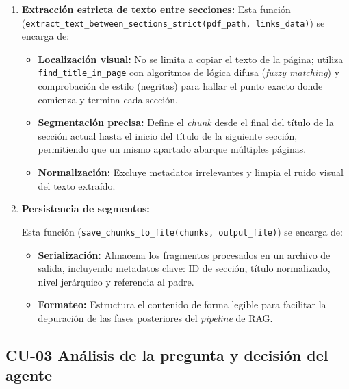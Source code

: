 \begin{enumerate}
    \item \textbf{Extracción estricta de texto entre secciones:}
    Esta función (\texttt{extract\_text\_be\-tween\_sec\-tions\_strict(pdf\_path, links\_data)}) se encarga de:
    \begin{itemize}
        \item \textbf{Localización visual:} No se limita a copiar el texto de la página; utiliza \texttt{find\_title\_\allowbreak in\_page} con algoritmos de lógica difusa (\textit{fuzzy matching}) y comprobación de estilo (negritas) para hallar el punto exacto donde comienza y termina cada sección.
        \item \textbf{Segmentación precisa:} Define el \textit{chunk} desde el final del título de la sección actual hasta el inicio del título de la siguiente sección, permitiendo que un mismo apartado abarque múltiples páginas.
        \item \textbf{Normalización:} Excluye metadatos irrelevantes y limpia el ruido visual del texto extraído.
    \end{itemize}

    \item \textbf{Persistencia de segmentos:}

    Esta función (\texttt{save\_chunks\_to\_file(chunks, output\_file)}) se encarga de:
    \begin{itemize}
        \item \textbf{Serialización:} Almacena los fragmentos procesados en un archivo de salida, incluyendo metadatos clave: ID de sección, título normalizado, nivel jerárquico y referencia al padre.
        \item \textbf{Formateo:} Estructura el contenido de forma legible para facilitar la depuración de las fases posteriores del \textit{pipeline} de RAG.
    \end{itemize}
\end{enumerate}

\subsection {CU-03 Análisis de la pregunta y decisión del agente}

